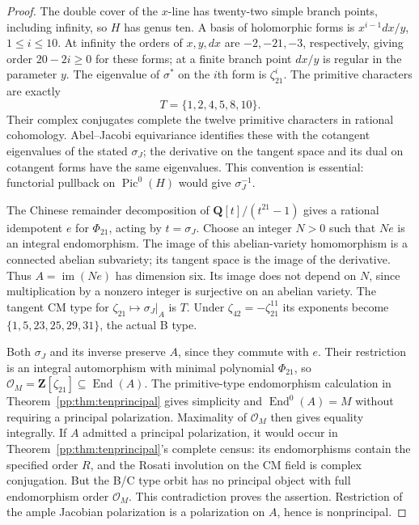 \begin{proof}
The double cover of the $x$-line has twenty-two simple branch points,
including infinity, so $H$ has genus ten. A basis of holomorphic forms is
$x^{i-1}dx/y$, $1\leq i\leq10$. At infinity the orders of $x,y,dx$ are
$-2,-21,-3$, respectively, giving order $20-2i\geq0$ for these forms;
at a finite branch point $dx/y$ is regular in the parameter $y$.
The eigenvalue of $\sigma^*$ on the $i$th form is $\zeta_{21}^i$.
The primitive characters are exactly
\[
T=\{1,2,4,5,8,10\}.
\]
Their complex conjugates complete the twelve primitive characters in
rational cohomology. Abel--Jacobi equivariance identifies these with the
cotangent eigenvalues of the stated $\sigma_J$; the derivative on the tangent space and its dual on cotangent
forms have the same eigenvalues. This convention is essential:
functorial pullback on $\operatorname{Pic}^0(H)$ would give $\sigma_J^{-1}$.

The Chinese remainder decomposition of $\mathbf Q[t]/(t^{21}-1)$ gives
a rational idempotent $e$ for $\Phi_{21}$, acting by $t=\sigma_J$.
Choose an integer $N>0$ such that $Ne$ is an integral endomorphism.
The image of this abelian-variety homomorphism is a connected abelian
subvariety; its tangent space is the image of the derivative. Thus
$A=\operatorname{im}(Ne)$ has dimension six. Its image does not depend on
$N$, since multiplication by a nonzero integer is surjective on an
abelian variety. The tangent CM type for $\zeta_{21}\mapsto\sigma_J|_A$
is $T$. Under $\zeta_{42}=-\zeta_{21}^{11}$ its exponents become
$\{1,5,23,25,29,31\}$, the actual B type.

Both $\sigma_J$ and its inverse preserve $A$, since they commute with $e$.
Their restriction is an integral automorphism with minimal polynomial
$\Phi_{21}$, so
$\mathcal O_M=\mathbf Z[\zeta_{21}]\subseteq\operatorname{End}(A)$.
The primitive-type endomorphism calculation in Theorem~\ref{pp:thm:tenprincipal} gives simplicity and
$\operatorname{End}^0(A)=M$ without requiring a principal polarization.
Maximality of $\mathcal O_M$ then gives equality integrally.
If $A$ admitted a principal polarization, it would occur in Theorem~\ref{pp:thm:tenprincipal}'s complete
census: its endomorphisms contain the specified order $R$, and the Rosati
involution on the CM field is complex conjugation. But the B/C type orbit
has no principal object with full endomorphism order $\mathcal O_M$.
This contradiction proves the assertion. Restriction of the ample
Jacobian polarization is a polarization on $A$, hence is nonprincipal.
\end{proof}

